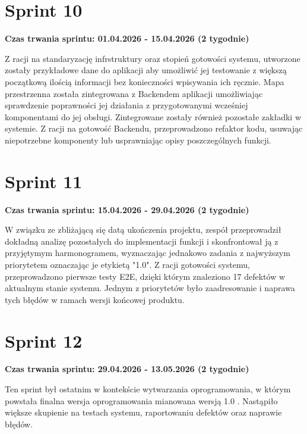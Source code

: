 \section{Sprint 10}
\textbf{Czas trwania \Gls{sprint}u: 01.04.2026 - 15.04.2026 (2 tygodnie)}
\par
Z racji na standaryzację infrstruktury oraz stopień gotowości systemu, utworzone zostały przykładowe dane do aplikacji aby umożliwić jej testowanie z większą początkową ilością informacji bez konieczności wpisywania ich ręcznie.
Mapa przestrzenna została zintegrowana z \gls{Backend}em aplikacji umożliwiając sprawdzenie poprawności jej działania z przygotowanymi wcześniej komponentami do jej obsługi.
Zintegrowane zostały również pozostałe zakładki w systemie.
Z racji na gotowość \gls{Backend}u, przeprowadzono refaktor kodu, usuwając niepotrzebne komponenty lub usprawniając opisy poszczególnych funkcji.

\section{Sprint 11}
\textbf{Czas trwania \Gls{sprint}u: 15.04.2026 - 29.04.2026 (2 tygodnie)}
\par
W związku ze zbliżającą się datą ukończenia projektu, zespół przeprowadził dokładną analizę pozostałych do implementacji funkcji i skonfrontował ją z przyjętymym harmonogramem, wyznaczając jednakowo zadania z najwyższym priorytetem oznaczając je etykietą "1.0".
Z racji gotowości systemu, przeprowadzono pierwsze testy \gls{E2E}, dzięki którym znaleziono 17 defektów w aktualnym stanie systemu.
Jednym z priorytetów było zaadresowanie i naprawa tych błędów w ramach wersji końcowej produktu.

\section{Sprint 12}
\textbf{Czas trwania \Gls{sprint}u: 29.04.2026 - 13.05.2026 (2 tygodnie)}
\par
Ten \gls{sprint} był ostatnim w kontekście wytwarzania oprogramowania, w którym powstała finalna wersja oprogramowania mianowana wersją 1.0 .
Nastąpiło większe skupienie na testach systemu, raportowaniu defektów oraz naprawie błędów.
